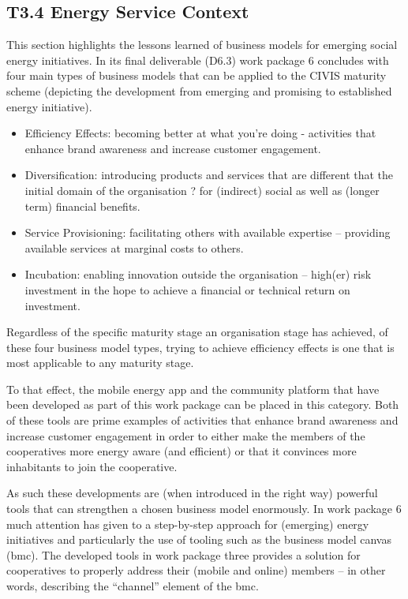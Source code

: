 \subsection{T3.4 Energy Service Context}

This section highlights the lessons learned of business models for emerging social energy initiatives.
In its final deliverable (D6.3) work package 6 concludes with four main types of business models that can be applied to the CIVIS maturity scheme (depicting the development from emerging and promising to established energy initiative). 

\begin{itemize}
\item Efficiency Effects: becoming better at what you're doing - activities that enhance brand awareness and increase customer engagement.
\item Diversification: introducing products and services that are different that the initial domain of the organisation ? for (indirect) social as well as (longer term) financial benefits. 
\item Service Provisioning: facilitating others with available expertise -- providing available services at marginal costs to others.
\item Incubation: enabling innovation outside the organisation -- high(er) risk investment in the hope to achieve a financial or technical return on investment. 
\end{itemize}

Regardless of the specific maturity stage an organisation stage has achieved, of these four business model types, trying to achieve efficiency effects is one that is most applicable to any maturity stage. 

To that effect, the mobile energy app and the community platform that have been developed as part of this work package can be placed in this category. Both of these tools are prime examples of activities that enhance brand awareness and increase customer engagement in order to either make the members of the cooperatives more energy aware (and efficient) or that it convinces more inhabitants to join the cooperative.

As such these developments are (when introduced in the right way) powerful tools that can strengthen a chosen business model enormously. In work package 6 much attention has given to a step-by-step approach for (emerging) energy initiatives and particularly the use of tooling such as the business model canvas (bmc). The developed tools in work package three provides a solution for cooperatives to properly address their (mobile and online) members -- in other words, describing the ``channel'' element of the bmc.

